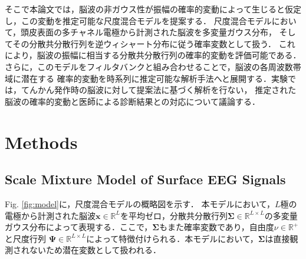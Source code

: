 \documentclass[journal]{IEEEtran}
\begin{document}
そこで本論文では，脳波の非ガウス性が振幅の確率的変動によって生じると仮定し，この変動を推定可能な尺度混合モデルを提案する．
尺度混合モデルにおいて，頭皮表面の多チャネル電極から計測された脳波を多変量ガウス分布，
そしてその分散共分散行列を逆ウィシャート分布に従う確率変数として扱う．
これにより，脳波の振幅に相当する分散共分散行列の確率的変動を評価可能である．
さらに，このモデルをフィルタバンクと組み合わせることで，脳波の各周波数帯域に潜在する
確率的変動を時系列に推定可能な解析手法へと展開する．実験では，てんかん発作時の脳波に対して提案法に基づく解析を行ない，
推定された脳波の確率的変動と医師による診断結果との対応について議論する．

\section{Methods}

\subsection{Scale Mixture Model of Surface EEG Signals}
Fig. \ref{fig:model}に，尺度混合モデルの概略図を示す．
本モデルにおいて，$L$極の電極から計測された脳波$\mathbf{x} \in \mathbb{R}^{L}$を平均ゼロ，分散共分散行列$\bm {\Sigma} \in \mathbb{R}^{L \times L}$の多変量ガウス分布によって表現する．ここで，$\bm {\Sigma}$もまた確率変数であり，自由度$\nu \in \mathbb{R}^+$ と尺度行列 ${\bm \Psi} \in \mathbb{R}^{L \times L}$によって特徴付けられる．本モデルにおいて，$\bm \Sigma$は直接観測されないため潜在変数として扱われる．
\end{document}
